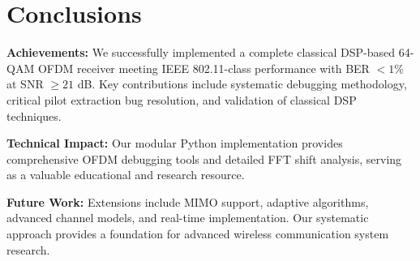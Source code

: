 \documentclass[11pt,a4paper]{article}
\begin{document}
\section{Conclusions}

\textbf{Achievements:} We successfully implemented a complete classical DSP-based 64-QAM OFDM receiver meeting IEEE 802.11-class performance with BER $< 1\%$ at SNR $\geq 21$ dB. Key contributions include systematic debugging methodology, critical pilot extraction bug resolution, and validation of classical DSP techniques.

\textbf{Technical Impact:} Our modular Python implementation provides comprehensive OFDM debugging tools and detailed FFT shift analysis, serving as a valuable educational and research resource.

\textbf{Future Work:} Extensions include MIMO support, adaptive algorithms, advanced channel models, and real-time implementation. Our systematic approach provides a foundation for advanced wireless communication system research.
\end{document}
